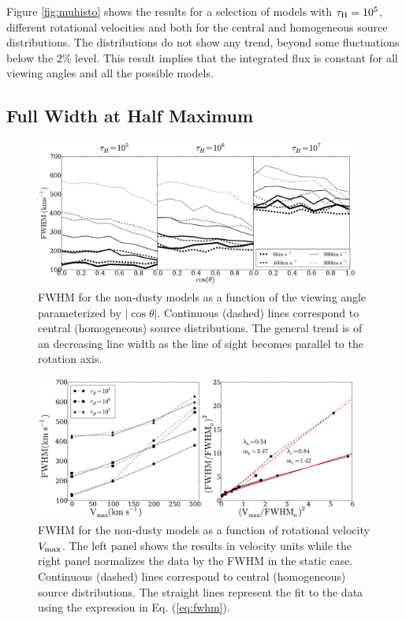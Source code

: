 \documentclass{emulateapj}
\begin{document}
Figure \ref{fig:muhisto} shows the results for a selection of models
with $\tau_{\rm H}=10^{5}$, different rotational velocities and both
for the central and homogeneous source distributions. The
distributions do not show any trend, beyond some fluctuations below
the $2\%$ level. This result implies that the integrated flux is
constant for all viewing angles and all the possible models. 
	

\subsection{Full Width at Half Maximum}
\label{sec:widthpeak}

\begin{figure}
\begin{center}
  \includegraphics[width=0.95\textwidth]{f6.pdf}
\end{center}
  \caption{FWHM for the non-dusty models as a function of the viewing
  angle parameterized by $|\cos\theta|$. Continuous (dashed) lines  correspond
  to central (homogeneous) source distributions. The general trend is
  of an decreasing line width as the line of sight becomes parallel to the
  rotation axis.
  \label{fig:widthvsmu}} 
\end{figure}

\begin{figure}
\begin{center}
  \includegraphics[width=0.95\textwidth]{f7.pdf}
\end{center}
\caption{FWHM for the non-dusty models as a function of
  rotational velocity $V_{\rm max}$. The left panel shows the
  results in velocity units while the right panel normalizes
  the data by the FWHM in the static case. 
  Continuous (dashed) lines  correspond to central (homogeneous)
  source distributions. The straight lines represent the fit to
  the data using the expression in Eq. (\ref{eq:fwhm}).
  \label{fig:widthsvsvelocity}}
\end{figure}
\end{document}
